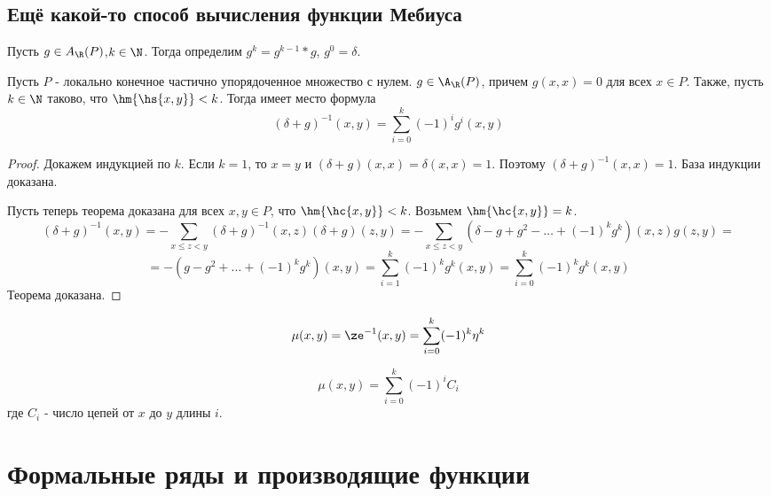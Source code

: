 \documentclass[unicode, 10pt, a4paper, oneside, fleqn]{article}
\begin{document}
\subsection{Ещё какой-то способ вычисления функции Мебиуса}
\begin{df}
  Пусть $g\in A_\R(P)$,$k\in\N$. Тогда определим $g^k=g^{k-1}\ast g$, $g^0=\delta$.
\end{df}
\begin{theorem}
  Пусть $P$ - локально конечное частично упорядоченное множество с нулем.
  $g\in\A_\R(P)$, причем $g(x,x) =0 $ для всех $x\in P$. Также, пусть $k\in\N$ таково,
  что $\hm{\hs{x,y}}<k$. Тогда имеет место формула
  \begin{displaymath}
    (\delta+g)^{-1}(x,y) = \sum_{i=0}^k(-1)^ig^i(x,y)
  \end{displaymath}
\end{theorem}
\begin{proof}
  Докажем индукцией по $k$.
  Если $k=1$, то $x=y$ и $(\delta+g)(x,x) = \delta(x,x) =1$.
  Поэтому $(\delta+g)^{-1}(x,x) = 1$. База индукции доказана.


  Пусть теперь теорема доказана для всех $x,y\in P$, что $\hm{\hc{x,y}}<k$. Возьмем 
  $\hm{\hc{x,y}}=k$.
  \begin{displaymath}
    (\delta+g)^{-1}(x,y) = -\sum_{x\le z<y}(\delta+g)^{-1}(x,z)(\delta+g)(z,y) = 
    -\sum_{x\le z<y}(\delta-g+g^2-\dots+(-1)^kg^k)(x,z)g(z,y) =
  \end{displaymath}
  \begin{displaymath}
    = -(g-g^2+\dots+(-1)^kg^k)(x,y)=\sum_{i=1}^k (-1)^kg^k(x,y)=\sum_{i=0}^k (-1)^kg^k(x,y)
  \end{displaymath}
  Теорема доказана.
\end{proof}
\begin{imp}
  \begin{displaymath}
    \mu(x,y)=\ze^{-1}(x,y)=\sum^k_{i=0}(-1)^k\eta^k
  \end{displaymath}
\end{imp}
\begin{imp}
  \begin{displaymath}
    \mu(x,y) = \sum^k_{i=0}(-1)^iC_i
  \end{displaymath}
  где $C_i$ - число цепей от $x$ до $y$ длины $i$.\WHY
\end{imp}
\section{Формальные ряды и производящие функции}
\end{document}
